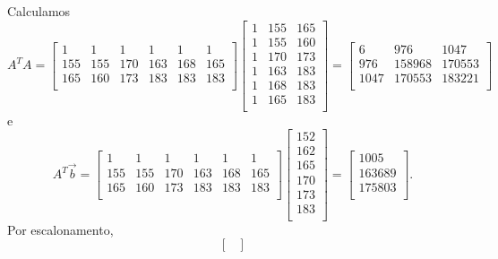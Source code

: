 \documentclass[../livro.tex]{subfiles}  %
\begin{document}
\begin{example}
\begin{equation}
  \end{equation} Calculamos
  \begin{equation}
  A^TA =
  \begin{bmatrix}
    1 & 1 & 1 & 1 & 1 & 1 \\
    155 & 155 & 170 & 163 & 168 & 165 \\
    165 & 160 & 173 & 183 & 183 & 183 \\
  \end{bmatrix}
  \begin{bmatrix}
    1 & 155 & 165 \\
    1 & 155 & 160 \\
    1 & 170 & 173 \\
    1 & 163 & 183 \\
    1 & 168 & 183 \\
    1 & 165 & 183 \\
  \end{bmatrix} =
  \begin{bmatrix}
    6 & 976 & 1047 \\
    976 & 158968 & 170553 \\
    1047 & 170553 & 183221 \\
  \end{bmatrix}
  \end{equation} e
  \begin{equation}
  A^T \vec{b} =
  \begin{bmatrix}
    1 & 1 & 1 & 1 & 1 & 1 \\
    155 & 155 & 170 & 163 & 168 & 165 \\
    165 & 160 & 173 & 183 & 183 & 183 \\
  \end{bmatrix}
  \begin{bmatrix}
    152  \\
    162  \\
    165  \\
    170  \\
    173  \\
    183  \\
  \end{bmatrix} =
  \begin{bmatrix}
    1005  \\
    163689  \\
    175803 \\
  \end{bmatrix}.
  \end{equation} Por escalonamento,
  \begin{equation}
  \begin{bmatrix}

\end{bmatrix}
\end{equation}
\end{example}
\end{document}
